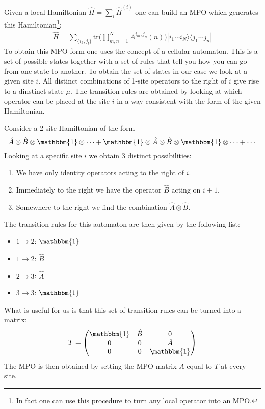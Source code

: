 	\begin{method}
		Given a local Hamiltonian $\hat{H}=\sum_i\hat{H}^{(i)}$ one can build an MPO which generates this Hamiltonian\footnote{In fact one can use this procedure to turn any local operator into an MPO.}:
		\begin{gather}
			\hat{H} = \sum_{\{i_k,j_l\}}\text{tr}\Big(\prod_{m,n=1}^NA^{i_m,j_n}(n)\Big)|i_1\cdots i_N\rangle\langle j_1\cdots j_n|
		 \end{gather}
		 To obtain this MPO form one uses the concept of a cellular automaton. This is a set of possible states together with a set of rules that tell you how you can go from one state to another. To obtain the set of states in our case we look at a given site $i$. All distinct combinations of 1-site operators to the right of $i$ give rise to a dinstinct state $\mu$. The transition rules are obtained by looking at which operator can be placed at the site $i$ in a way consistent with the form of the given Hamiltonian.
	\end{method}
	\begin{example}
		Consider a 2-site Hamiltonian of the form \[\hat{A}\otimes\hat{B}\otimes\mathbbm{1}\otimes\cdots+\mathbbm{1}\otimes\hat{A}\otimes\hat{B}\otimes\mathbbm{1}\otimes\cdots+\cdots\] Looking at a specific site $i$ we obtain 3 distinct possibilities:
		\begin{enumerate}
			\item We have only identity operators acting to the right of $i$.
			\item Immediately to the right we have the operator $\hat{B}$ acting on $i+1$.
			\item Somewhere to the right we find the combination $\hat{A}\otimes\hat{B}$.
		 \end{enumerate}
		 The transition rules for this automaton are then given by the following list:
		 \begin{itemize}
		 	\item $1\rightarrow2$: $\mathbbm{1}$
		 	\item $1\rightarrow2$: $\hat{B}$
		 	\item $2\rightarrow3$: $\hat{A}$
		 	\item $3\rightarrow3$: $\mathbbm{1}$
		 \end{itemize}
		 What is useful for us is that this set of transition rules can be turned into a matrix: \[T=\begin{pmatrix}\mathbbm{1}&\hat{B}&0\\0&0&\hat{A}\\0&0&\mathbbm{1}\end{pmatrix}\] The MPO is then obtained by setting the MPO matrix $A$ equal to $T$ at every site.
	\end{example}